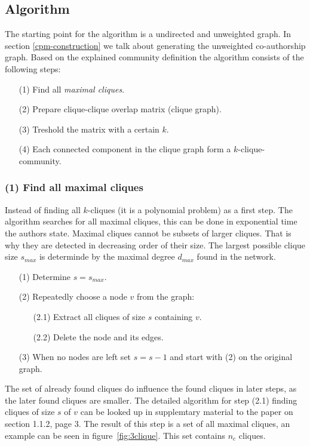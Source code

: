 \documentclass[runningheads,a4paper]{llncs}
\begin{document}
\subsection{Algorithm}
\label{cpm-algo}
The starting point for the algorithm is a undirected and unweighted graph. In section \ref{cpm-construction} we talk about generating the  unweighted co-authorship graph.
Based on the explained community definition the algorithm consists of the following steps:

\begin{enumerate}
\small
\item[(1)] Find all \emph{maximal cliques}.
\item[(2)] Prepare clique-clique overlap matrix (clique graph).
\item[(3)] Treshold the matrix with a certain $k$.
\item[(4)] Each connected component in the clique graph form a $k$-clique-community.
\end{enumerate}

\subsubsection{(1) Find all maximal cliques}
Instead of finding all $k$-cliques (it is a polynomial problem) as a first step.
The algorithm searches for all maximal cliques, this can be done in exponential time the authors state.
Maximal cliques cannot be subsets of larger cliques.
That is why they are detected in decreasing order of their size.
The largest possible clique size $s_{max}$ is determinde by the maximal degree $d_{max}$ found in the network.

\begin{enumerate}
\small
\item[(1)] Determine $s=s_{max}$.
\item[(2)] Repeatedly choose a node $v$ from the graph:
	\begin{enumerate}
		\item[(2.1)] Extract all cliques of size $s$ containing $v$.
		\item[(2.2)] Delete the node and its edges.
	\end{enumerate}
\item[(3)] When no nodes are left set $s=s-1$ and start with (2) on the original graph.
\end{enumerate}

The set of already found cliques do influence the found cliques in later steps, as the later found cliques are smaller.
The detailed algorithm for step (2.1) finding cliques of size $s$ of $v$ can be looked up in supplemtary material to the paper on section 1.1.2, page 3.
The result of this step is a set of all maximal cliques, an example can be seen in figure~\ref{fig:3clique}.
This set contains $n_c$ cliques.
\end{document}

